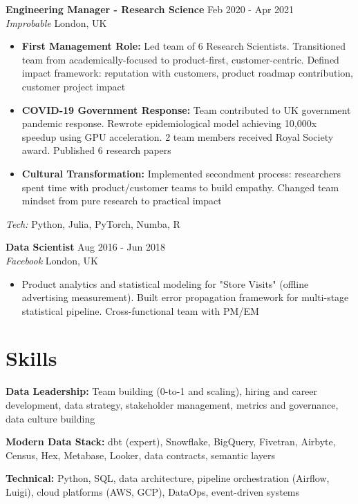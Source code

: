 \documentclass[10pt,a4paper]{article}
\newcommand{\cventry}[5]{
    \textbf{#1} \hfill {\small\color{darkgray} #2} \\
    {\color{accentcolor}\textit{#3}} \hfill {\small\color{darkgray} #4} \\
    #5
    \vspace{6pt}
}
\begin{document}
\cventry
    {Engineering Manager - Research Science}
    {Feb 2020 - Apr 2021}
    {Improbable}
    {London, UK}
    {
    \begin{itemize}[leftmargin=*, itemsep=1pt, parsep=0pt, topsep=2pt]
        \item \textbf{First Management Role:} Led team of 6 Research Scientists. Transitioned team from academically-focused to product-first, customer-centric. Defined impact framework: reputation with customers, product roadmap contribution, customer project impact
        \item \textbf{COVID-19 Government Response:} Team contributed to UK government pandemic response. Rewrote epidemiological model achieving 10,000x speedup using GPU acceleration. 2 team members received Royal Society award. Published 6 research papers
        \item \textbf{Cultural Transformation:} Implemented secondment process: researchers spent time with product/customer teams to build empathy. Changed team mindset from pure research to practical impact
    \end{itemize}
    \textit{Tech:} Python, Julia, PyTorch, Numba, R
    }

\cventry
    {Data Scientist}
    {Aug 2016 - Jun 2018}
    {Facebook}
    {London, UK}
    {
    \begin{itemize}[leftmargin=*, itemsep=1pt, parsep=0pt, topsep=2pt]
        \item Product analytics and statistical modeling for "Store Visits" (offline advertising measurement). Built error propagation framework for multi-stage statistical pipeline. Cross-functional team with PM/EM
    \end{itemize}
    }

\section*{Skills}

\textbf{Data Leadership:} Team building (0-to-1 and scaling), hiring and career development, data strategy, stakeholder management, metrics and governance, data culture building

\textbf{Modern Data Stack:} dbt (expert), Snowflake, BigQuery, Fivetran, Airbyte, Census, Hex, Metabase, Looker, data contracts, semantic layers

\textbf{Technical:} Python, SQL, data architecture, pipeline orchestration (Airflow, Luigi), cloud platforms (AWS, GCP), DataOps, event-driven systems
\end{document}

